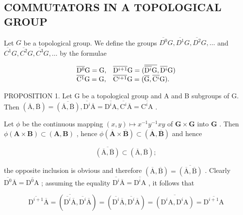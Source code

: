 \subsection{COMMUTATORS IN A TOPOLOGICAL GROUP}

Let \(G\) be a topological group. We define the groups \(\overline{D^0}G, \overline{D^1}G, \overline{D^2}G, \ldots\) and \(\overline{C^1}G, \overline{C^2}G, \overline{C^3}G, \ldots\) by the formulae

\[
\begin{array}{l l} \overline {{\mathrm{D} ^ {0}}} \mathrm{G} = \mathrm{G}, & \overline {{\mathrm{D} ^ {i + 1}}} \mathrm{G} = (\overline {{\overline {{\mathrm{D} ^ {i}}} \mathrm{G}}}, \overline {{\mathrm{D} ^ {i}}} \mathrm{G}) \\ \overline {{\mathrm{C} ^ {1}}} \mathrm{G} = \mathrm{G}, & \overline {{\mathrm{C} ^ {i + 1}}} \mathrm{G} = (\overline {{\mathrm{G}}}, \overline {{\mathrm{C} ^ {i}}} \mathrm{G}). \end{array}
\]

PROPOSITION 1. Let G be a topological group and A and B subgroups of G. Then \((\overline{\mathrm{A}},\overline{\mathrm{B}}) = \overline{(\overline{\mathrm{A}},\overline{\mathrm{B}})},\overline{\mathrm{D}^{i}}\overline{\mathrm{A}} = \overline{\mathrm{D}^{i}\mathrm{A}},\overline{\mathrm{C}^{i}}\overline{\mathrm{A}} = \overline{\mathrm{C}^{i}\mathrm{A}}\) .

Let \(\phi\) be the continuous mapping \((x,y)\mapsto x^{-1}y^{-1}xy\) of \(\mathbf{G}\times \mathbf{G}\) into \(\mathbf{G}\) . Then \(\phi (\mathbf{A}\times \mathbf{B})\subset (\mathbf{A},\mathbf{B})\) , hence \(\phi (\overline{\mathbf{A}}\times \overline{\mathbf{B}})\subset (\overline{\mathbf{A}},\overline{\mathbf{B}})\) and hence

\[
\overline{(\overline{\mathrm{A}},\overline{\mathrm{B}})} \subset (\overline{\mathrm{A}},\overline{\mathrm{B}});
\]

the opposite inclusion is obvious and therefore \((\overline{\mathrm{A}},\overline{\mathrm{B}}) = \overline{(\overline{\mathrm{A}},\overline{\mathrm{B}})}\) . Clearly \(\overline{\mathrm{D}^{0}}\overline{\mathrm{A}} = \overline{\mathrm{D}^{0}\mathrm{A}}\) ; assuming the equality \(\overline{\mathrm{D}^{i}}\overline{\mathrm{A}} = \overline{\mathrm{D}^{i}\mathrm{A}}\) , it follows that

\[
\overline{\mathrm{D}^{i+1}}\overline{\mathrm{A}} = (\overline{\overline{\mathrm{D}^{i}}\overline{\mathrm{A}}},\overline{\mathrm{D}^{i}}\overline{\mathrm{A}}) = (\overline{\mathrm{D}^{i}}\overline{\mathrm{A}},\overline{\mathrm{D}^{i}}\overline{\mathrm{A}}) = \overline{(\mathrm{D}^{i}\mathrm{A},\mathrm{D}^{i}\mathrm{A})} = \overline{\mathrm{D}^{i+1}\mathrm{A}}
\]

